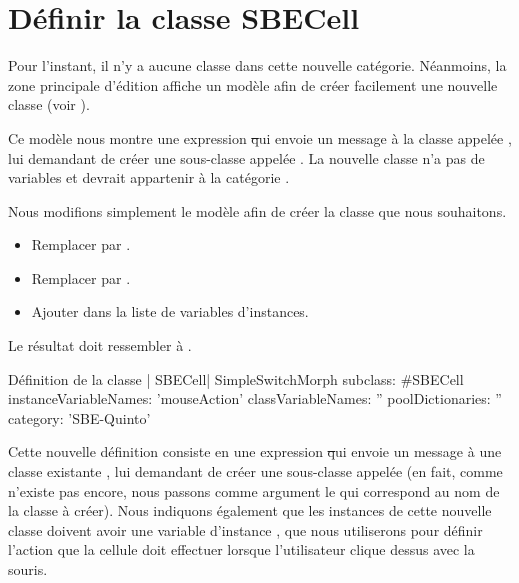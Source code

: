 \documentclass[a4paper,10pt,twoside]{book}
\begin{document}
\section{Définir la classe SBECell}

Pour l'instant, il n'y a aucune classe dans cette nouvelle catégorie. Néanmoins, la zone principale d'édition affiche un modèle afin de créer facilement une nouvelle classe (voir ).

Ce modèle nous montre une expression \st qui envoie un message à la classe appelée , lui demandant de créer une sous-classe appelée .  La nouvelle classe n'a pas de variables et devrait appartenir à la catégorie .

Nous modifions simplement le modèle afin de créer la classe que nous souhaitons.

\begin{itemize}
  \item Remplacer  par .
  \item Remplacer  par .
  \item Ajouter  dans la liste de variables d'instances.
\end{itemize}
Le résultat doit ressembler à .

\begin{classdef}[firstClassDef]{Définition de la classe \ct| SBECell|}
SimpleSwitchMorph subclass: #SBECell
   instanceVariableNames: 'mouseAction'
   classVariableNames: ''
   poolDictionaries: ''
   category: 'SBE-Quinto'
\end{classdef}

Cette nouvelle définition consiste en une expression \st qui envoie un message à une classe existante , lui demandant de créer une sous-classe appelée 
(en fait, comme  n'existe pas encore, nous passons comme argument le   qui correspond au nom de la classe à créer).
Nous indiquons également que les instances de cette nouvelle classe doivent avoir une variable d'instance , que nous utiliserons pour définir l'action que la cellule doit effectuer lorsque l'utilisateur clique dessus avec la souris.
\end{document}
